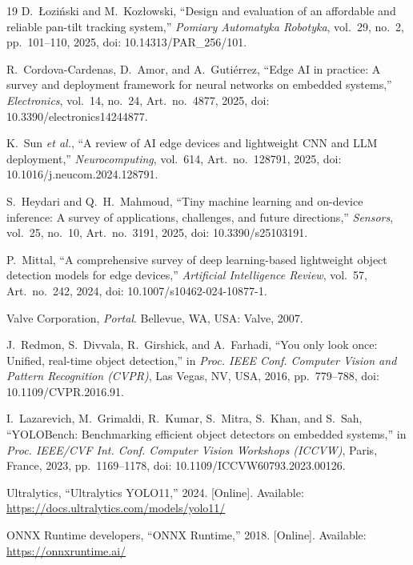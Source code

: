 \documentclass[lettersize,journal]{IEEEtran}
\begin{document}
\begin{thebibliography}{19}
D.~{\L}ozi{\'n}ski and M.~Koz{\l}owski, ``Design and evaluation of an affordable and reliable pan-tilt tracking system,'' \emph{Pomiary Automatyka Robotyka}, vol.~29, no.~2, pp.~101--110, 2025, doi: 10.14313/PAR\_256/101.

R.~Cordova-Cardenas, D.~Amor, and A.~Guti{\'e}rrez, ``Edge AI in practice: A survey and deployment framework for neural networks on embedded systems,'' \emph{Electronics}, vol.~14, no.~24, Art.~no.~4877, 2025, doi: 10.3390/electronics14244877.

K.~Sun \emph{et al.}, ``A review of AI edge devices and lightweight CNN and LLM deployment,'' \emph{Neurocomputing}, vol.~614, Art.~no.~128791, 2025, doi: 10.1016/j.neucom.2024.128791.

S.~Heydari and Q.~H.~Mahmoud, ``Tiny machine learning and on-device inference: A survey of applications, challenges, and future directions,'' \emph{Sensors}, vol.~25, no.~10, Art.~no.~3191, 2025, doi: 10.3390/s25103191.

P.~Mittal, ``A comprehensive survey of deep learning-based lightweight object detection models for edge devices,'' \emph{Artificial Intelligence Review}, vol.~57, Art.~no.~242, 2024, doi: 10.1007/s10462-024-10877-1.

Valve Corporation, \emph{Portal}. Bellevue, WA, USA: Valve, 2007.

J.~Redmon, S.~Divvala, R.~Girshick, and A.~Farhadi, ``You only look once: Unified, real-time object detection,'' in \emph{Proc. IEEE Conf. Computer Vision and Pattern Recognition (CVPR)}, Las Vegas, NV, USA, 2016, pp.~779--788, doi: 10.1109/CVPR.2016.91.

I.~Lazarevich, M.~Grimaldi, R.~Kumar, S.~Mitra, S.~Khan, and S.~Sah, ``YOLOBench: Benchmarking efficient object detectors on embedded systems,'' in \emph{Proc. IEEE/CVF Int. Conf. Computer Vision Workshops (ICCVW)}, Paris, France, 2023, pp.~1169--1178, doi: 10.1109/ICCVW60793.2023.00126.

Ultralytics, ``Ultralytics YOLO11,'' 2024. [Online]. Available: \url{https://docs.ultralytics.com/models/yolo11/}

ONNX Runtime developers, ``ONNX Runtime,'' 2018. [Online]. Available: \url{https://onnxruntime.ai/}


\end{thebibliography}
\end{document}
